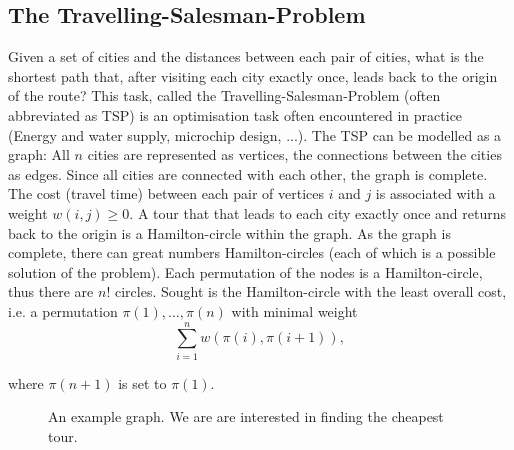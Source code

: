 \documentclass[10pt,a4paper,DIV=11]{scrreprt}
\begin{document}
\subsection{The Travelling-Salesman-Problem}
Given a set of cities and the distances between each pair of cities, what is the shortest path that, after visiting each city exactly once, 
leads back to the origin of the route?  This task, called the Travelling-Salesman-Problem (often abbreviated as TSP) is an optimisation task 
often encountered in practice (Energy and water supply, microchip design, ...). The TSP can be modelled as a graph: All $n$ cities are represented 
as vertices, the connections between the cities as edges. Since all cities are connected with each other, the graph is complete. 
The cost (travel time) between each pair of vertices $i$ and $j$ is associated with a weight $w(i,j) \geq 0$. 
A tour that that leads to each city exactly once and returns back to the origin is a Hamilton-circle within the graph. As the graph is complete, 
there can great numbers Hamilton-circles (each of which is a possible solution of the problem). 
Each permutation of the nodes is a Hamilton-circle, thus there are $n!$ circles. Sought is the Hamilton-circle with the least overall cost, i.e. a 
permutation $\pi(1),\dots,\pi(n)$ with minimal weight
\begin{equation}
    \sum\limits_{i=1}^n w(\pi(i),\pi(i+1)), 
\end{equation}

where $\pi(n+1)$ is set to $\pi(1)$.\cite{MATHINF}\\

\begin{figure}[H]
\centering
\caption{An example graph. We are are interested in finding the cheapest tour.\cite{MATHINF}}
\label{fig:feedback}
\end{figure}
\end{document}
